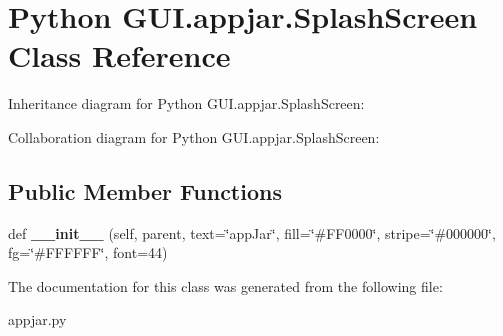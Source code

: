 \hypertarget{class_python_01_g_u_i_1_1appjar_1_1_splash_screen}{}\section{Python G\+U\+I.\+appjar.\+Splash\+Screen Class Reference}
\label{class_python_01_g_u_i_1_1appjar_1_1_splash_screen}


Inheritance diagram for Python G\+U\+I.\+appjar.\+Splash\+Screen\+:


Collaboration diagram for Python G\+U\+I.\+appjar.\+Splash\+Screen\+:
\subsection*{Public Member Functions}
\begin{DoxyCompactItemize}
\item 
\mbox{\label{class_python_01_g_u_i_1_1appjar_1_1_splash_screen_a67e54bc17b3b4df12414336157f07de4}} 
def {\bfseries \+\_\+\+\_\+init\+\_\+\+\_\+} (self, parent, text=\char`\"{}app\+Jar\char`\"{}, fill=\char`\"{}\#F\+F0000\char`\"{}, stripe=\char`\"{}\#000000\char`\"{}, fg=\char`\"{}\#F\+F\+F\+F\+FF\char`\"{}, font=44)
\end{DoxyCompactItemize}


The documentation for this class was generated from the following file\+:\begin{DoxyCompactItemize}
\item 
appjar.\+py\end{DoxyCompactItemize}
